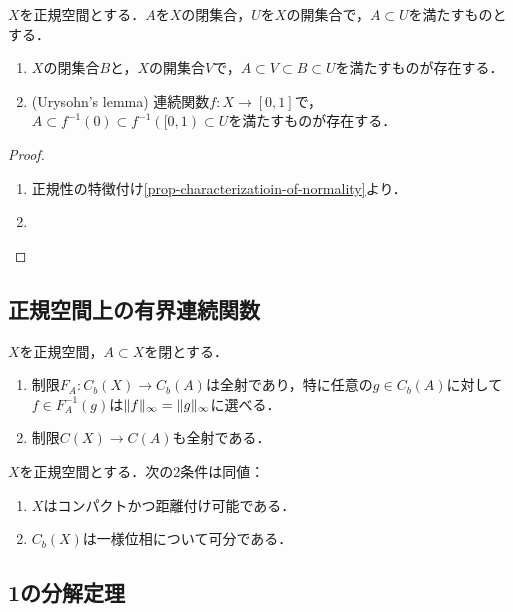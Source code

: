 \documentclass[uplatex,dvipdfmx]{jsreport}
\begin{document}
\begin{lemma}\label{lemma-Urysohn's-lemma}
    $X$を正規空間とする．$A$を$X$の閉集合，$U$を$X$の開集合で，$A\subset U$を満たすものとする．
    \begin{enumerate}
        \item $X$の閉集合$B$と，$X$の開集合$V$で，$A\subset V\subset B\subset U$を満たすものが存在する．
        \item (Urysohn's lemma) 連続関数$f:X\to[0,1]$で，$A\subset f^{-1}(0)\subset f^{-1}([0,1)\subset U$を満たすものが存在する．
    \end{enumerate}
\end{lemma}
\begin{proof}\mbox{}
    \begin{enumerate}
        \item 正規性の特徴付け\ref{prop-characterizatioin-of-normality}より．
        \item 
    \end{enumerate}
\end{proof}

\subsection{正規空間上の有界連続関数}

\begin{theorem}[Tietzeの延長定理 (AC)]
    $X$を正規空間，$A\subset X$を閉とする．
    \begin{enumerate}
        \item 制限$F_A:C_b(X)\to C_b(A)$は全射であり，特に任意の$g\in C_b(A)$に対して$f\in F_A^{-1}(g)$は$\|f\|_\infty=\|g\|_\infty$に選べる．
        \item 制限$C(X)\to C(A)$も全射である．
    \end{enumerate}
\end{theorem}

\begin{corollary}[有界連続関数の空間が可分になる条件 (AC)]
    $X$を正規空間とする．次の2条件は同値：
    \begin{enumerate}
        \item $X$はコンパクトかつ距離付け可能である．
        \item $C_b(X)$は一様位相について可分である．
    \end{enumerate}
\end{corollary}

\subsection{1の分解定理}
\end{document}
